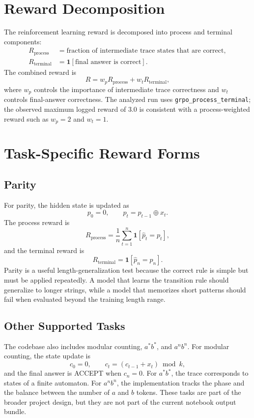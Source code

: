\documentclass[11pt]{article}
\begin{document}
\section{Reward Decomposition}
The reinforcement learning reward is decomposed into process and terminal components:
\begin{align*}
R_{\mathrm{process}} &= \text{fraction of intermediate trace states that are correct},\\
R_{\mathrm{terminal}} &= \mathbf{1}[\text{final answer is correct}].
\end{align*}
The combined reward is
\[
R = w_p R_{\mathrm{process}} + w_t R_{\mathrm{terminal}},
\]
where $w_p$ controls the importance of intermediate trace correctness and $w_t$ controls final-answer correctness. The analyzed run uses \texttt{grpo\_process\_terminal}; the observed maximum logged reward of 3.0 is consistent with a process-weighted reward such as $w_p=2$ and $w_t=1$.

\section{Task-Specific Reward Forms}
\subsection{Parity}
For parity, the hidden state is updated as
\[
p_0 = 0, \qquad p_t = p_{t-1} \oplus x_t.
\]
The process reward is
\[
R_{\mathrm{process}} = \frac{1}{n}\sum_{t=1}^{n}\mathbf{1}[\hat p_t = p_t],
\]
and the terminal reward is
\[
R_{\mathrm{terminal}} = \mathbf{1}[\hat p_n = p_n].
\]
Parity is a useful length-generalization test because the correct rule is simple but must be applied repeatedly. A model that learns the transition rule should generalize to longer strings, while a model that memorizes short patterns should fail when evaluated beyond the training length range.

\subsection{Other Supported Tasks}
The codebase also includes modular counting, $a^*b^*$, and $a^n b^n$. For modular counting, the state update is
\[
c_0 = 0, \qquad c_t = (c_{t-1}+x_t) \bmod k,
\]
and the final answer is ACCEPT when $c_n=0$. For $a^*b^*$, the trace corresponds to states of a finite automaton. For $a^n b^n$, the implementation tracks the phase and the balance between the number of $a$ and $b$ tokens. These tasks are part of the broader project design, but they are not part of the current notebook output bundle.
\end{document}
